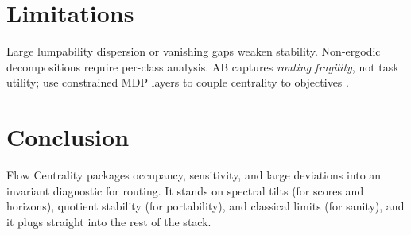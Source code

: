 \documentclass[11pt]{article}
\newcommand{\1}{\mathbbm{1}}
\begin{document}
\section{Limitations}\label{sec:limits}
Large lumpability dispersion or vanishing gaps weaken stability. Non-ergodic decompositions require per-class analysis. AB captures \emph{routing fragility}, not task utility; use constrained MDP layers to couple centrality to objectives \parencite{Altman1999,Puterman1994}.

\section{Conclusion}\label{sec:conclusion}
Flow Centrality packages occupancy, sensitivity, and large deviations into an invariant diagnostic for routing. It stands on spectral tilts (for scores and horizons), quotient stability (for portability), and classical limits (for sanity), and it plugs straight into the rest of the stack.

\printbibliography
\end{document}

